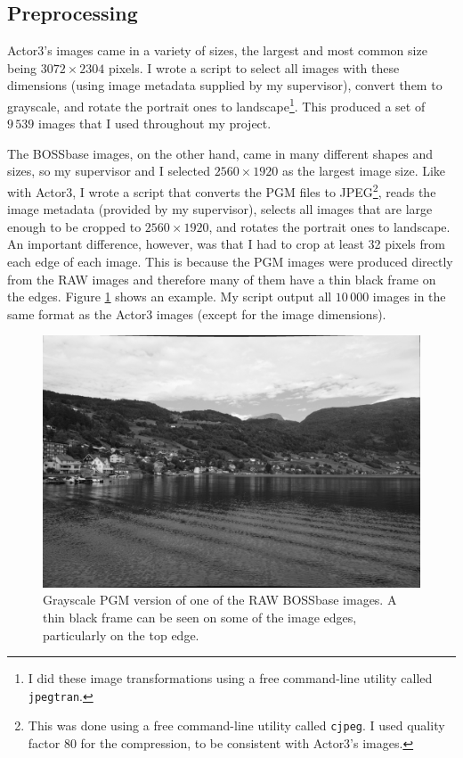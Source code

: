 \documentclass[11pt,a4paper,twoside,openright]{report}
\begin{document}
\subsection{Preprocessing} \label{sec:preprocessing}
Actor3's images came in a variety of sizes, the largest and most common size being $3072\times2304$ pixels. I wrote a script to select all images with these dimensions (using image metadata supplied by my supervisor), convert them to grayscale, and rotate the portrait ones to landscape\footnote{I did these image transformations using a free command-line utility called \texttt{jpegtran}.}. This produced a set of $9\,539$ images that I used throughout my project.

The BOSSbase images, on the other hand, came in many different shapes and sizes, so my supervisor and I selected $2560\times1920$ as the largest image size. Like with Actor3, I wrote a script that converts the PGM files to JPEG\footnote{This was done using a free command-line utility called \texttt{cjpeg}. I used quality factor 80 for the compression, to be consistent with Actor3's images.}, reads the image metadata (provided by my supervisor), selects all images that are large enough to be cropped to $2560\times1920$, and rotates the portrait ones to landscape. An important difference, however, was that I had to crop at least 32 pixels from each edge of each image. This is because the PGM images were produced directly from the RAW images and therefore many of them have a thin black frame on the edges. Figure \ref{bossbase-image-with-frame-lens} shows an example. My script output all $10\,000$ images in the same format as the Actor3 images (except for the image dimensions).

\begin{figure}[htbp] 
	\begin{center}
		\includegraphics[width=0.5\linewidth]{bossbase_image00031.jpg}
		\caption{Grayscale PGM version of one of the RAW BOSSbase images. A thin black frame  can be seen on some of the image edges, particularly on the top edge.}
		\label{bossbase-image-with-frame-lens}
	\end{center}
\end{figure}
\end{document}
